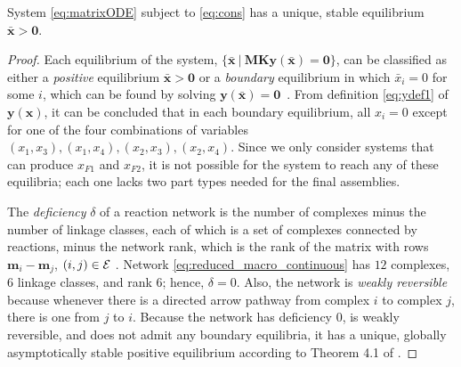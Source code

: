 \begin{theorem}\label{thm:unique_equilibrium}
System \eqref{eq:matrixODE} subject to \eqref{eq:cons} has a unique,
stable equilibrium $\mathbf{\bar{x}} > \mathbf{0}$.
\end{theorem}
\begin{proof}  Each equilibrium of the system, $\{\mathbf{\bar{x}}
~|~\mathbf{M}\mathbf{K}\mathbf{y(\bar{x})} = \mathbf{0}\}$, can be
classified as either a {\it positive} equilibrium $\mathbf{\bar{x}}
> \mathbf{0}$ or a {\it boundary} equilibrium in which $\bar{x}_i
= 0$ for some $i$, which can be found by solving
$\mathbf{y(\mathbf{\bar{x}})} =
\mathbf{0}$~\cite{Chaves:2004p11839}.  From definition
\eqref{eq:ydef1} of $\mathbf{y(x)}$, it can be concluded that in
each boundary equilibrium, all $x_i = 0$ except for one of the four
combinations of variables $(x_1,x_3), (x_1,x_4), (x_2,x_3),
(x_2,x_4)$.  Since we only consider systems that can produce
$x_{F1}$ and $x_{F2}$, it is not possible for the system to reach
any of these equilibria; each one lacks two part types needed for
the final assemblies.


The {\it deficiency} $\delta$ of a reaction network is the number of
complexes minus the number of linkage classes, each of which is a
set of complexes connected by reactions, minus the network rank,
which is the rank of the matrix with rows $\mathbf{m}_i -
\mathbf{m}_j$, $(i,j) \in \cal{E}$ \cite{Feinberg:1995p9419}.
 Network \eqref{eq:reduced_macro_continuous} has $12$ complexes, $6$
linkage classes, and rank $6$; hence, $\delta = 0$.  Also, the
network is {\it weakly reversible} because whenever there is a
directed arrow pathway from complex $i$ to complex $j$, there is one
from $j$ to $i$.  Because the network has deficiency $0$, is weakly
reversible, and does not admit any boundary equilibria, it has a
unique, globally asymptotically stable positive equilibrium
according to Theorem 4.1 of \cite{Siegel:2000}.
\end{proof}


